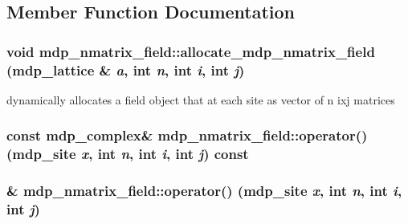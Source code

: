\subsection{Member Function Documentation}
\hypertarget{classmdp__nmatrix__field_ad8803e7b0f9a755329a1d7335ac0c019}{
\subsubsection[{allocate\_\-mdp\_\-nmatrix\_\-field}]{\setlength{\rightskip}{0pt plus 5cm}void mdp\_\-nmatrix\_\-field::allocate\_\-mdp\_\-nmatrix\_\-field ({\bf mdp\_\-lattice} \& {\em a}, \/  int {\em n}, \/  int {\em i}, \/  int {\em j})}}
\label{classmdp__nmatrix__field_ad8803e7b0f9a755329a1d7335ac0c019}


dynamically allocates a field object that at each site as vector of n ixj matrices \hypertarget{classmdp__nmatrix__field_a4898cffa6a8e35bece4ed99a49499f3f}{
\subsubsection[{operator()}]{\setlength{\rightskip}{0pt plus 5cm}const {\bf mdp\_\-complex}\& mdp\_\-nmatrix\_\-field::operator() ({\bf mdp\_\-site} {\em x}, \/  int {\em n}, \/  int {\em i}, \/  int {\em j}) const}}
\label{classmdp__nmatrix__field_a4898cffa6a8e35bece4ed99a49499f3f}
\hypertarget{classmdp__nmatrix__field_ab166e6abe76fcafd63dec9739da8324c}{
\subsubsection[{operator()}]{\& mdp\_\-nmatrix\_\-field::operator() ({\bf mdp\_\-site} {\em x}, \/  int {\em n}, \/  int {\em i}, \/  int {\em j})}}
\label{classmdp__nmatrix__field_ab166e6abe76fcafd63dec9739da8324c}


